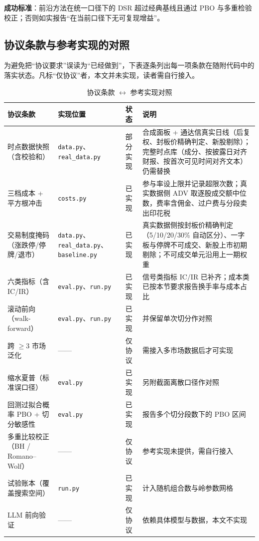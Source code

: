 \textbf{成功标准}：前沿方法在统一口径下的 DSR 超过经典基线且通过 PBO 与多重检验校正；否则如实报告“在当前口径下无可复现增益”。

\subsection{协议条款与参考实现的对照}

为避免把“协议要求”误读为“已经做到”，下表逐条列出每一项条款在随附代码中的落实状态。凡标“仅协议”者，本文并未实现，读者需自行接入。

\begin{table}[htbp]
\centering
\caption{协议条款 $\leftrightarrow$ 参考实现对照}
\label{tab:impl}
\begin{tabular}{@{}>{\raggedright\arraybackslash}p{4.0cm}>{\raggedright\arraybackslash}p{3.6cm}>{\raggedright\arraybackslash}p{1.6cm}>{\raggedright\arraybackslash}p{5.4cm}@{}}
\toprule
协议条款 & 实现位置 & 状态 & 说明 \\
\midrule
时点数据快照（含校验和） & \texttt{data.py}、\texttt{real\_data.py} & 部分实现 & 合成面板 + 通达信真实日线（后复权、封板价精确判定、新股剔除）；完整时点库（成分、按披露日对齐财报、按首次可见时间对齐文本）仍需替换 \\
三档成本 + 平方根冲击 & \texttt{costs.py} & 已实现 & 参与率设上限并记录超限次数；真实数据侧 ADV 取逐股成交额中位数，费率含佣金、过户费与分段卖出印花税 \\
交易制度掩码（涨跌停/停牌/退市） & \texttt{data.py}、\texttt{real\_data.py}、\texttt{baseline.py} & 已实现 & 真实数据侧按封板价精确判定（5/10/20/30\% 自动区分）、一字板与停牌不可成交、新股上市初期剔除；不可成交单元沿用上一期权重 \\
六类指标（含 IC/IR） & \texttt{eval.py}、\texttt{run.py} & 已实现 & 信号类指标 IC/IR 已补齐；成本类已按本节要求报告换手率与成本占比 \\
滚动前向（walk-forward） & \texttt{eval.py}、\texttt{run.py} & 已实现 & 并保留单次切分作对照 \\
跨 $\geq 3$ 市场泛化 & —— & 仅协议 & 需接入多市场数据后才可实现 \\
缩水夏普（标准误口径） & \texttt{eval.py} & 已实现 & 另附截面离散口径作对照 \\
回测过拟合概率 PBO + 切分敏感性 & \texttt{eval.py} & 已实现 & 报告多个切分段数下的 PBO 区间 \\
多重比较校正（BH / Romano--Wolf） & —— & 仅协议 & 参考实现未提供，需自行接入 \\
试验账本（覆盖搜索空间） & \texttt{run.py} & 已实现 & 计入随机组合数与岭参数网格 \\
LLM 前向验证 & —— & 仅协议 & 依赖具体模型与数据，本文不实现 \\
\bottomrule
\end{tabular}
\end{table}

